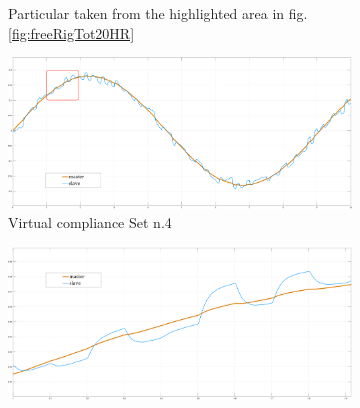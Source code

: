 \begin{figure}
\begin{subfigure}[h!]{1\linewidth}
		\caption{Particular taken from the highlighted area in fig.\ref{fig:freeRigTot20HR}}
		\label{fig:freeRigPar20HR}
	\end{subfigure}	
  \newline
	\begin{subfigure}[h!]{1\linewidth}
		\centering
		\includegraphics[width=\textwidth, height=\textwidth/4]{Images/freeSet20Tot20HtznoiseRect}
		\caption{Virtual compliance Set n.4}
		\label{fig:freeSetTot20HR}
	\end{subfigure}	
  \newline
	\begin{subfigure}[h!]{1\linewidth}
		\centering
		\includegraphics[width=\textwidth, height=\textwidth/4]{Images/freeSet20Part20Htznoise}

\end{subfigure}
\end{figure}
